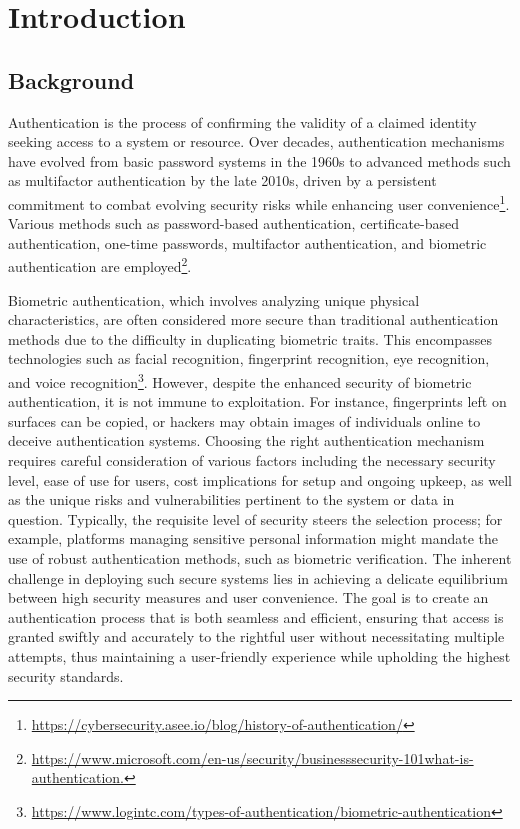 \section{Introduction}

\subsection{Background}
Authentication is the process of confirming the validity of a claimed identity seeking access to a system or resource. Over decades, authentication mechanisms have evolved from basic password systems in the 1960s to advanced methods such as multifactor authentication by the late 2010s, driven by a persistent commitment to combat evolving security risks while enhancing user convenience\footnote{\url{https://cybersecurity.asee.io/blog/history-of-authentication/}}. Various methods such as password-based authentication, certificate-based authentication, one-time passwords, multifactor authentication, and biometric authentication are employed\footnote{\url{https://www.microsoft.com/en-us/security/businesssecurity-101what-is-authentication.}}.

Biometric authentication, which involves analyzing unique physical characteristics, are often considered more secure than traditional authentication methods due to the difficulty in duplicating biometric traits. This encompasses technologies such as facial recognition, fingerprint recognition, eye recognition, and voice recognition\footnote{\url{https://www.logintc.com/types-of-authentication/biometric-authentication}}.
However, despite the enhanced security of biometric authentication, it is not immune to exploitation. For instance, fingerprints left on surfaces can be copied, or hackers may obtain images of individuals online to deceive authentication systems.
Choosing the right authentication mechanism requires careful consideration of various factors including the necessary security level, ease of use for users, cost implications for setup and ongoing upkeep, as well as the unique risks and vulnerabilities pertinent to the system or data in question. Typically, the requisite level of security steers the selection process; for example, platforms managing sensitive personal information might mandate the use of robust authentication methods, such as biometric verification. The inherent challenge in deploying such secure systems lies in achieving a delicate equilibrium between high security measures and user convenience. The goal is to create an authentication process that is both seamless and efficient, ensuring that access is granted swiftly and accurately to the rightful user without necessitating multiple attempts, thus maintaining a user-friendly experience while upholding the highest security standards.

